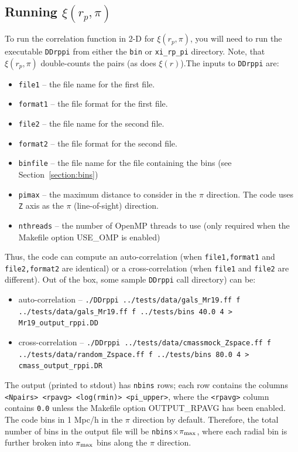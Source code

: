 \documentclass[12pt,titlepage,justified]{article}
\newcommand{\xir}{\ensuremath{{\xi(r)}}\xspace}
\newcommand{\xirppi}{\ensuremath{{\xi(r_p,\pi)}}\xspace}
\newcommand{\pimax}{\ensuremath{{\pi_{\rm max}}}\xspace}
\begin{document}
\subsection{Running \texorpdfstring{\xirppi}{xi(rp,pi)}}
To run the correlation function in 2-D for \xirppi, you will need to run the executable \texttt{DDrppi} from either the \texttt{bin} or \texttt{xi\_rp\_pi} directory. Note, that 
\xirppi double-counts the pairs (as does \xir).The inputs 
to \texttt{DDrppi} are:
\begin{itemize}
\item \texttt{file1}   -- the file name for the first file.
\item \texttt{format1} -- the file format for the first file.
\item \texttt{file2}   -- the file name for the second file.
\item \texttt{format2} -- the file format for the second file.
\item \texttt{binfile} -- the file name for the file containing the bins (see Section~\ref{section:bins})
\item \texttt{pimax}   -- the maximum distance to consider in the $\pi$ direction. The code uses \texttt{Z} axis as the $\pi$ (line-of-sight) direction. 
\item \texttt{nthreads} -- the number of OpenMP threads to use (only required when the Makefile option USE\_OMP is enabled)
\end{itemize}
Thus, the code can compute an auto-correlation (when \texttt{file1,format1} and \texttt{file2,format2} are identical) or a cross-correlation (when \texttt{file1} and \texttt{file2} are different). Out of the box, 
some sample \texttt{DDrppi} call directory) can be:
\begin{itemize}
\item auto-correlation --  {\scriptsize \texttt{./DDrppi  ../tests/data/gals\_Mr19.ff f ../tests/data/gals\_Mr19.ff f ../tests/bins 40.0 4 > Mr19\_output\_rppi.DD}}
\item cross-correlation -- {\scriptsize \texttt{./DDrppi ../tests/data/cmassmock\_Zspace.ff f ../tests/data/random\_Zspace.ff f ../tests/bins 80.0 4 > cmass\_output\_rppi.DR}}
\end{itemize}
The output (printed to stdout) has \texttt{nbins} rows; each row contains the columns \texttt{<Npairs> <rpavg> <log(rmin)> <pi\_upper>}, where the \texttt{<rpavg>} column contains \texttt{0.0} unless the 
Makefile option OUTPUT\_RPAVG has been enabled. The code bins in 1 Mpc/h in the $\pi$ direction by default. Therefore, 
the total number of bins in the output file will be \texttt{nbins$\times$\pimax}, where each radial bin is further broken into \pimax bins along the 
$\pi$ direction. 
\end{document}
